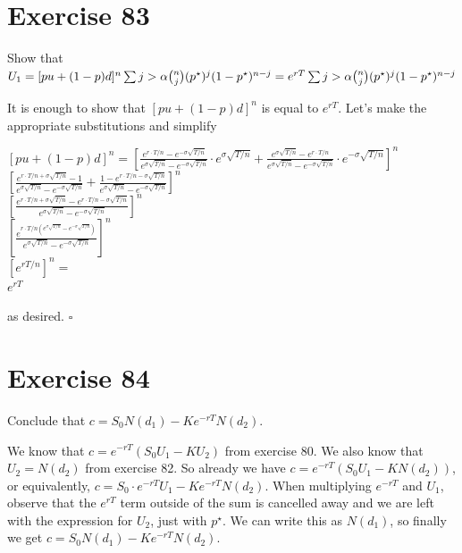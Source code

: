\documentclass{article}
\begin{document}
\section*{Exercise 83}
Show that $U_1=[pu+(1-p)d]^n\sum{j>\alpha}{}{n\choose j}(p^{\star})^j(1-p^{\star})^{n-j}=e^{rT}\sum{j>\alpha}{}{n\choose j}(p^{\star})^j(1-p^{\star})^{n-j}\\$
\begin{flushleft}
    It is enough to show that $[pu + (1-p)d]^n$ is equal to $e^{rT}$. Let's make the appropriate substitutions and simplify
    \begin{center}
        $[pu + (1-p)d]^n = [\frac{e^{r \cdot T/n} - e^{-\sigma \sqrt{T/n}}}{e^{\sigma \sqrt{T/n}}-e^{-\sigma \sqrt{T/n}}} \cdot e^{\sigma \sqrt{T/n}} + \frac{e^{\sigma \sqrt{T/n}} - e^{r \cdot T/n}}{e^{\sigma \sqrt{T/n}}-e^{-\sigma \sqrt{T/n}}} \cdot e^{-\sigma \sqrt{T/n}}]^n$ \\
        $[\frac{e^{r \cdot T/n + \sigma \sqrt{T/n}} - 1}{e^{\sigma \sqrt{T/n}}-e^{-\sigma \sqrt{T/n}}} + \frac{1 - e^{r \cdot T/n - \sigma \sqrt{T/n}}}{e^{\sigma \sqrt{T/n}}-e^{-\sigma \sqrt{T/n}}}]^n$ \\
        $[\frac{e^{r \cdot T/n + \sigma \sqrt{T/n}} - e^{r \cdot T/n - \sigma \sqrt{T/n}}}{e^{\sigma \sqrt{T/n}}-e^{-\sigma \sqrt{T/n}}}]^n$ \\
        $[\frac{e^{r \cdot T/n (e^{\sigma \sqrt{T/n}} - e^{-\sigma \sqrt{T/n}})}}{e^{\sigma \sqrt{T/n}}-e^{-\sigma \sqrt{T/n}}}]^n$ \\
        $[e^{rT/n}]^n = $ \\
        $e^{rT}$
    \end{center}
    as desired. $\square$
\end{flushleft}

\section*{Exercise 84}
Conclude that $c = S_0N(d_1) - Ke^{-rT}N(d_2)$.
\begin{flushleft}
    We know that $c = e^{-rT}(S_0U_1 - KU_2)$ from exercise 80. We also know that $U_2 = N(d_2)$ from exercise 82. So already we have $c = e^{-rT}(S_0U_1 - KN(d_2))$, or equivalently, 
    $c = S_0 \cdot e^{-rT}U_1 - Ke^{-rT}N(d_2)$. When multiplying $e^{-rT}$ and $U_1$, observe that the $e^{rT}$ term outside of the sum is cancelled away and we are left with the expression for $U_2$, just with $p^\star$.
    We can write this as $N(d_1)$, so finally we get $c = S_0N(d_1) - Ke^{-rT}N(d_2)$.
\end{flushleft}
\end{document}
